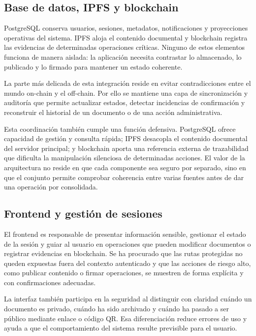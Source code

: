 \documentclass[11pt, a4paper]{article}
\begin{document}
\subsection{Base de datos, IPFS y blockchain}

PostgreSQL conserva usuarios, sesiones, metadatos, notificaciones y proyecciones operativas del sistema. IPFS aloja el contenido documental y blockchain registra las evidencias de determinadas operaciones críticas. Ninguno de estos elementos funciona de manera aislada: la aplicación necesita contrastar lo almacenado, lo publicado y lo firmado para mantener un estado coherente.

La parte más delicada de esta integración reside en evitar contradicciones entre el mundo on-chain y el off-chain. Por ello se mantiene una capa de sincronización y auditoría que permite actualizar estados, detectar incidencias de confirmación y reconstruir el historial de un documento o de una acción administrativa.

Esta coordinación también cumple una función defensiva. PostgreSQL ofrece capacidad de gestión y consulta rápida; IPFS desacopla el contenido documental del servidor principal; y blockchain aporta una referencia externa de trazabilidad que dificulta la manipulación silenciosa de determinadas acciones. El valor de la arquitectura no reside en que cada componente sea seguro por separado, sino en que el conjunto permite comprobar coherencia entre varias fuentes antes de dar una operación por consolidada.

\subsection{Frontend y gestión de sesiones}

El frontend es responsable de presentar información sensible, gestionar el estado de la sesión y guiar al usuario en operaciones que pueden modificar documentos o registrar evidencias en blockchain. Se ha procurado que las rutas protegidas no queden expuestas fuera del contexto autenticado y que las acciones de riesgo alto, como publicar contenido o firmar operaciones, se muestren de forma explícita y con confirmaciones adecuadas.

La interfaz también participa en la seguridad al distinguir con claridad cuándo un documento es privado, cuándo ha sido archivado y cuándo ha pasado a ser público mediante enlace o código QR. Esa diferenciación reduce errores de uso y ayuda a que el comportamiento del sistema resulte previsible para el usuario.
\end{document}
